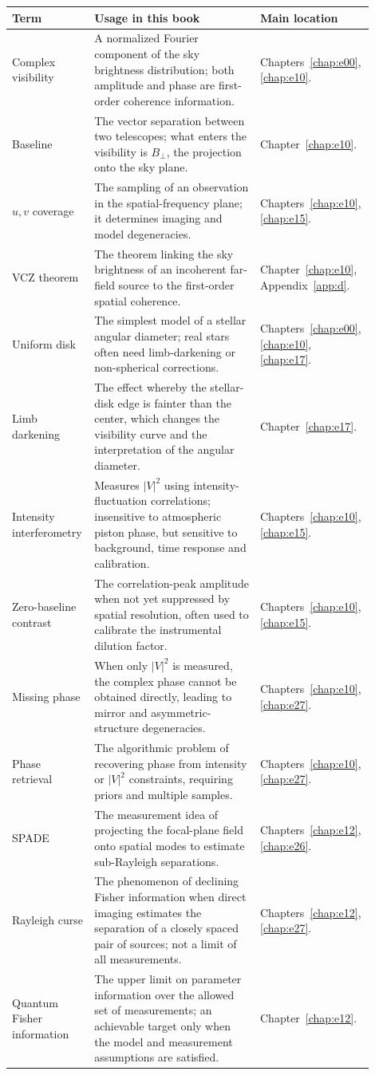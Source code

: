 \begin{longtable}{p{0.20\linewidth}p{0.45\linewidth}p{0.25\linewidth}}
\toprule
Term & Usage in this book & Main location \\
\midrule
Complex visibility & A normalized Fourier component of the sky brightness distribution; both amplitude and phase are first-order coherence information. & Chapters~\ref{chap:e00}, \ref{chap:e10}. \\
Baseline & The vector separation between two telescopes; what enters the visibility is \(B_\perp\), the projection onto the sky plane. & Chapter~\ref{chap:e10}. \\
\(u,v\) coverage & The sampling of an observation in the spatial-frequency plane; it determines imaging and model degeneracies. & Chapters~\ref{chap:e10}, \ref{chap:e15}. \\
VCZ theorem & The theorem linking the sky brightness of an incoherent far-field source to the first-order spatial coherence. & Chapter~\ref{chap:e10}, Appendix~\ref{app:d}. \\
Uniform disk & The simplest model of a stellar angular diameter; real stars often need limb-darkening or non-spherical corrections. & Chapters~\ref{chap:e00}, \ref{chap:e10}, \ref{chap:e17}. \\
Limb darkening & The effect whereby the stellar-disk edge is fainter than the center, which changes the visibility curve and the interpretation of the angular diameter. & Chapter~\ref{chap:e17}. \\
Intensity interferometry & Measures \(|V|^2\) using intensity-fluctuation correlations; insensitive to atmospheric piston phase, but sensitive to background, time response and calibration. & Chapters~\ref{chap:e10}, \ref{chap:e15}. \\
Zero-baseline contrast & The correlation-peak amplitude when not yet suppressed by spatial resolution, often used to calibrate the instrumental dilution factor. & Chapters~\ref{chap:e10}, \ref{chap:e15}. \\
Missing phase & When only \(|V|^2\) is measured, the complex phase cannot be obtained directly, leading to mirror and asymmetric-structure degeneracies. & Chapters~\ref{chap:e10}, \ref{chap:e27}. \\
Phase retrieval & The algorithmic problem of recovering phase from intensity or \(|V|^2\) constraints, requiring priors and multiple samples. & Chapters~\ref{chap:e10}, \ref{chap:e27}. \\
SPADE & The measurement idea of projecting the focal-plane field onto spatial modes to estimate sub-Rayleigh separations. & Chapters~\ref{chap:e12}, \ref{chap:e26}. \\
Rayleigh curse & The phenomenon of declining Fisher information when direct imaging estimates the separation of a closely spaced pair of sources; not a limit of all measurements. & Chapters~\ref{chap:e12}, \ref{chap:e27}. \\
Quantum Fisher information & The upper limit on parameter information over the allowed set of measurements; an achievable target only when the model and measurement assumptions are satisfied. & Chapter~\ref{chap:e12}. \\
\bottomrule
\end{longtable}

